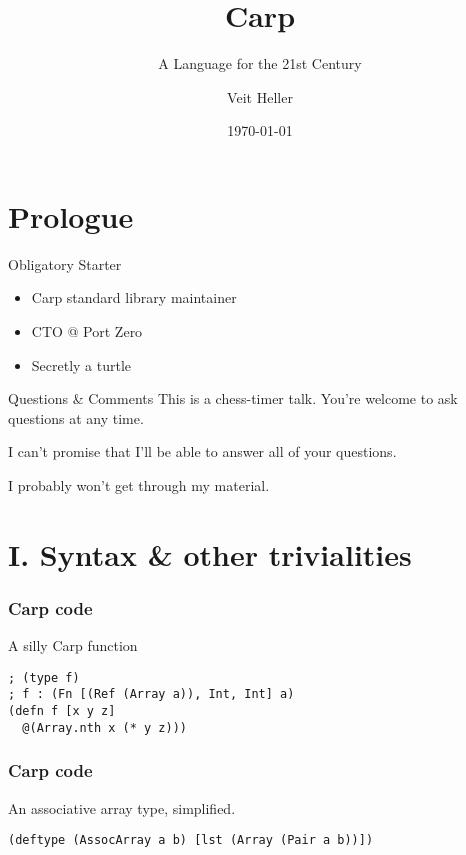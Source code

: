 \documentclass[aspectratio=169]{beamer}
\title{Carp}
\subtitle{A Language for the 21st Century}
\date{\today}
\author{Veit Heller}
\institute{Port Zero}
\begin{document}
  \maketitle
  \section{Prologue}
  \begin{frame}{Obligatory Starter}
    \begin{itemize}
      \item Carp standard library maintainer
      \item CTO @ Port Zero
      \item Secretly a turtle
    \end{itemize}
  \end{frame}
  \begin{frame}{Questions \& Comments}
    This is a chess-timer talk. You’re welcome to ask questions at any time.
    \linebreak

    I can’t promise that I’ll be able to answer all of your questions.
    \linebreak

    I probably won’t get through my material.
  \end{frame}
  \section{I. Syntax \& other trivialities}
  \begin{frame}[fragile]
  \frametitle{Carp code}
    \begin{listing}[H]
      \caption{A silly Carp function}
      \begin{verbatim}
; (type f)
; f : (Fn [(Ref (Array a)), Int, Int] a)
(defn f [x y z]
  @(Array.nth x (* y z)))
      \end{verbatim}
    \end{listing}
  \end{frame}
  \begin{frame}[fragile]
    \frametitle{Carp code}
    \begin{listing}[H]
      \caption{An associative array type, simplified.}
      \begin{verbatim}
(deftype (AssocArray a b) [lst (Array (Pair a b))])
      \end{verbatim}
    \end{listing}
  \end{frame}
\end{document}
